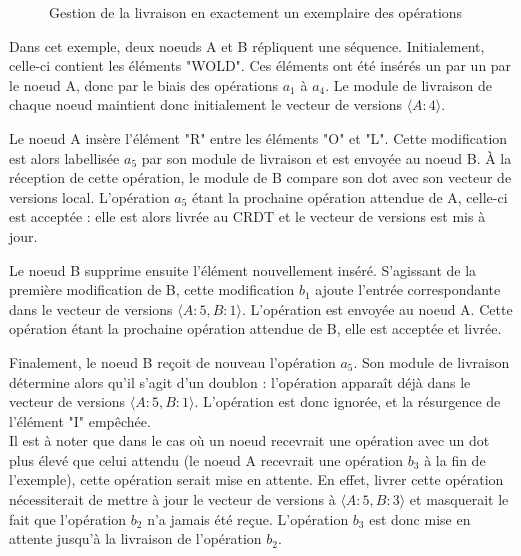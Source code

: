 \begin{figure}[!ht]
{\begin{minipage}{\linewidth}
{
        \label{fig:exactly-once-delivery-sync}
      }
      \end{minipage}
    }
  \caption{Gestion de la livraison en exactement un exemplaire des opérations}
  \label{fig:exactly-once-delivery}
\end{figure}

Dans cet exemple, deux noeuds A et B répliquent une séquence.
Initialement, celle-ci contient les éléments "WOLD".
Ces éléments ont été insérés un par un par le noeud A, donc par le biais des opérations $a_1$ à $a_4$.
Le module de livraison de chaque noeud maintient donc initialement le vecteur de versions $\langle A:4 \rangle$.

Le noeud A insère l'élément "R" entre les éléments "O" et "L".
Cette modification est alors labellisée $a_5$ par son module de livraison et est envoyée au noeud B.
À la réception de cette opération, le module de B compare son dot avec son vecteur de versions local.
L'opération $a_5$ étant la prochaine opération attendue de A, celle-ci est acceptée : elle est alors livrée au \ac{CRDT} et le vecteur de versions est mis à jour.

Le noeud B supprime ensuite l'élément nouvellement inséré.
S'agissant de la première modification de B, cette modification $b_1$ ajoute l'entrée correspondante dans le vecteur de versions $\langle A:5, B:1 \rangle$.
L'opération est envoyée au noeud A.
Cette opération étant la prochaine opération attendue de B, elle est acceptée et livrée.

Finalement, le noeud B reçoit de nouveau l'opération $a_5$.
Son module de livraison détermine alors qu'il s'agit d'un doublon : l'opération apparaît déjà dans le vecteur de versions $\langle A:5, B:1 \rangle$.
L'opération est donc ignorée, et la résurgence de l'élément "I" empêchée.\\

Il est à noter que dans le cas où un noeud recevrait une opération avec un dot plus élevé que celui attendu (\eg le noeud A recevrait une opération $b_3$ à la fin de l'exemple), cette opération serait mise en attente.
En effet, livrer cette opération nécessiterait de mettre à jour le vecteur de versions à $\langle A:5,B:3 \rangle$ et masquerait le fait que l'opération $b_2$ n'a jamais été reçue.
L'opération $b_3$ est donc mise en attente jusqu'à la livraison de l'opération $b_2$.

